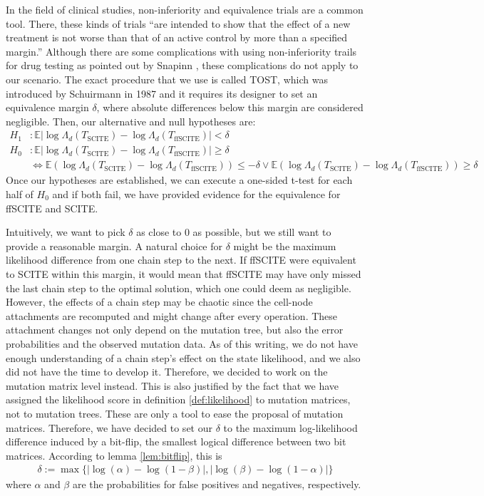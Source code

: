 In the field of clinical studies, non-inferiority and equivalence trials are a common tool. There, these kinds of trials ``are intended to show that the effect of a new treatment is not worse than that of an active control by more than a specified margin.'' \cite{snapinn2000noninferiority} Although there are some complications with using non-inferiority trails for drug testing as pointed out by Snapinn \cite{snapinn2000noninferiority}, these complications do not apply to our scenario. The exact procedure that we use is called \acf{TOST}, which was introduced by Schuirmann in 1987 \cite{schuirmann1987comparison} and it requires its designer to set an equivalence margin $\delta$, where absolute differences below this margin are considered negligible. Then, our alternative and null hypotheses are:
\begin{align*}
    H_1&: \mathbb{E} |\log\Lambda_d(T_\mathrm{SCITE}) - \log\Lambda_d(T_\mathrm{ffSCITE})| < \delta \\
    H_0&: \mathbb{E} |\log\Lambda_d(T_\mathrm{SCITE}) - \log\Lambda_d(T_\mathrm{ffSCITE})| \geq \delta \\
    &\Leftrightarrow \mathbb{E} \left(\log\Lambda_d(T_\mathrm{SCITE}) - \log\Lambda_d(T_\mathrm{ffSCITE})\right) \leq - \delta \vee \mathbb{E} \left(\log\Lambda_d(T_\mathrm{SCITE}) - \log\Lambda_d(T_\mathrm{ffSCITE})\right) \geq \delta
\end{align*}
Once our hypotheses are established, we can execute a one-sided t-test for each half of $H_0$ and if both fail, we have provided evidence for the equivalence for \ac{ffSCITE} and \ac{SCITE}.

Intuitively, we want to pick $\delta$ as close to 0 as possible, but we still want to provide a reasonable margin. A natural choice for $\delta$ might be the maximum likelihood difference from one chain step to the next. If ffSCITE were equivalent to SCITE within this margin, it would mean that ffSCITE may have only missed the last chain step to the optimal solution, which one could deem as negligible. However, the effects of a chain step may be chaotic since the cell-node attachments are recomputed and might change after every operation. These attachment changes not only depend on the mutation tree, but also the error probabilities and the observed mutation data. As of this writing, we do not have enough understanding of a chain step's effect on the state likelihood, and we also did not have the time to develop it. Therefore, we decided to work on the mutation matrix level instead. This is also justified by the fact that we have assigned the likelihood score in definition \ref{def:likelihood} to mutation matrices, not to mutation trees. These are only a tool to ease the proposal of mutation matrices. Therefore, we have decided to set our $\delta$ to the maximum log-likelihood difference induced by a bit-flip, the smallest logical difference between two bit matrices. According to lemma \ref{lem:bitflip}, this is 
\begin{align*}
    \delta :=\max\{|\log(\alpha) - \log(1-\beta)|, |\log(\beta) - \log(1-\alpha)|\}
\end{align*}
where $\alpha$ and $\beta$ are the probabilities for false positives and negatives, respectively.

